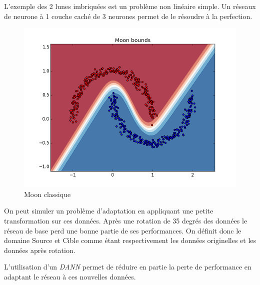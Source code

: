 L'exemple des 2 lunes imbriquées est un problème non linéaire simple. Un
réseaux de neurone à 1 couche caché de 3 neurones permet de le résoudre
à la perfection.

\begin{figure}[htbp]
\centering
\includegraphics[width=\columnwidth]{fig/moon-bound-0.png}
\caption{Moon classique}
\end{figure}

On peut simuler un problème d'adaptation en appliquant une petite
transformation sur ces données.
Après une rotation de 35 degrés des données le réseau de base perd une bonne
partie de ses performances. On définit donc le domaine Source et Cible
comme étant respectivement les données originelles et les données après
rotation.

L'utilisation d'un \emph{DANN} permet de réduire en partie la perte de 
performance en adaptant le réseau à ces nouvelles données.

